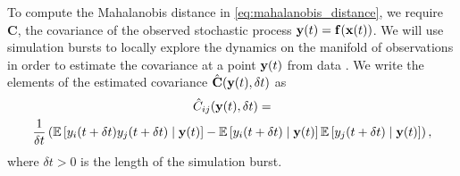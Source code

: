 To compute the Mahalanobis distance in \eqref{eq:mahalanobis_distance}, we require $\mathbf{C}$, the covariance of the observed stochastic process $\mathbf{y}(t) = \mathbf{f}( \mathbf{x}(t))$.
%
We will use simulation bursts to locally explore the dynamics on the manifold of observations in order to estimate the covariance at a point $\mathbf{y}(t)$ from data \cite{talmon2014manifold, talmon2014intrinsic}.
%
We write the elements of the estimated covariance $\hat{\mathbf{C}}(\mathbf{y}(t), \delta t)$ as
\begin{multline}\label{eq:estimated_cov_expected_value}
\hat{C}_{ij}(\mathbf{y}(t), \delta t)
= \\
\frac{1}{\delta t} \left( \mathbb{E} \left[ y_i (t+\delta t) y_j (t+ \delta t) \mid \mathbf{y}(t) \right]
- \mathbb{E} \left[ y_i (t+\delta t) \mid \mathbf{y}(t) \right] \mathbb{E} \left[ y_j (t+\delta t) \mid \mathbf{y}(t) \right] \right) ,
\end{multline}
%
where $\delta t > 0$ is the length of the simulation burst.



